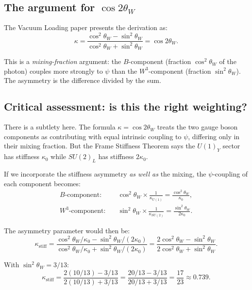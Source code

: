 \documentclass[aps,prd,twocolumn,superscriptaddress,nofootinbib]{revtex4-2}
\begin{document}
\subsection{The argument for $\cos 2\theta_W$}

The Vacuum Loading paper presents the derivation as:
\begin{equation}
\kappa = \frac{\cos^2\theta_W - \sin^2\theta_W}
{\cos^2\theta_W + \sin^2\theta_W} = \cos 2\theta_W.
\end{equation}

This is a \emph{mixing-fraction} argument: the $B$-component
(fraction $\cos^2\theta_W$ of the photon) couples more strongly to
$\psi$ than the $W^3$-component (fraction $\sin^2\theta_W$).  The
asymmetry is the difference divided by the sum.

\subsection{Critical assessment: is this the right weighting?}

There is a subtlety here.  The formula $\kappa = \cos 2\theta_W$
treats the two gauge boson components as contributing with equal
intrinsic coupling to $\psi$, differing only in their mixing fraction.
But the Frame Stiffness Theorem says the $U(1)_Y$ sector has
stiffness $\kappa_0$ while $SU(2)_L$ has stiffness $2\kappa_0$.

If we incorporate the stiffness asymmetry \emph{as well as} the
mixing, the $\psi$-coupling of each component becomes:
\begin{align}
\text{$B$-component:}& \quad \cos^2\theta_W \times \frac{1}{\kappa_{U(1)}}
= \frac{\cos^2\theta_W}{\kappa_0}, \\
\text{$W^3$-component:}& \quad \sin^2\theta_W \times \frac{1}{\kappa_{SU(2)}}
= \frac{\sin^2\theta_W}{2\kappa_0}.
\end{align}

The asymmetry parameter would then be:
\begin{equation}
\kappa_{\mathrm{stiff}} =
\frac{\cos^2\theta_W/\kappa_0 - \sin^2\theta_W/(2\kappa_0)}
{\cos^2\theta_W/\kappa_0 + \sin^2\theta_W/(2\kappa_0)}
= \frac{2\cos^2\theta_W - \sin^2\theta_W}
{2\cos^2\theta_W + \sin^2\theta_W}.
\label{eq:kappa-stiff}
\end{equation}

With $\sin^2\theta_W = 3/13$:
\begin{equation}
\kappa_{\mathrm{stiff}} = \frac{2(10/13) - 3/13}{2(10/13) + 3/13}
= \frac{20/13 - 3/13}{20/13 + 3/13}
= \frac{17}{23} \approx 0.739.
\end{equation}
\end{document}

